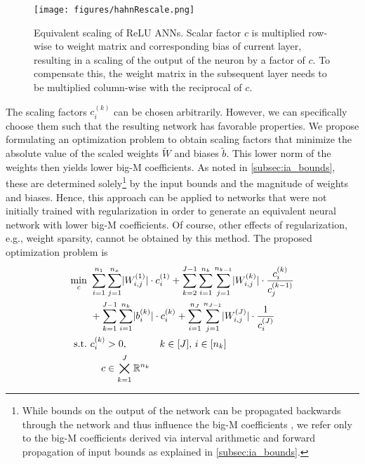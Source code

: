 \begin{figure}
    \centering
    \texttt{[image: figures/hahnRescale.png]}
    \caption{Equivalent scaling of ReLU ANNs. Scalar factor $c$ is multiplied row-wise to weight matrix and corresponding bias of current layer, resulting in a scaling of the output of the neuron by a factor of $c$. To compensate this, the weight matrix in the subsequent layer needs to be multiplied column-wise with the reciprocal of $c$.}
    \label{fig:rescale}
\end{figure}
%
The scaling factors $c_i^{(k)}$ can be chosen arbitrarily. However, we can specifically choose them such that the resulting network has favorable properties. We propose formulating an optimization problem to obtain scaling factors that minimize the absolute value of the scaled weights $\tilde{W}$ and biases $\tilde{b}$. This lower norm of the weights then yields lower big-M coefficients. As noted in \cref{subsec:ia_bounds}, these are determined solely\footnote{While bounds on the output of the network can be propagated backwards through the network and thus influence the big-M coefficients \citep{Grimstad2019}, we refer only to the big-M coefficients derived via interval arithmetic and forward propagation of input bounds as explained in \cref{subsec:ia_bounds}.} by the input bounds and the magnitude of weights and biases. Hence, this approach can be applied to networks that were not initially trained with regularization in order to generate an equivalent neural network with lower big-M coefficients. Of course, other effects of regularization, e.g., weight sparsity, cannot be obtained by this method. The proposed optimization problem is
%
\begin{equation}
    \begin{aligned}
        \min_{c}\ & \sum_{i=1}^{n_1} \sum_{j=1}^{n_x} \lvert W_{i,j}^{(1)} \rvert \cdot c_i^{(1)} +  \sum_{k=2}^{J-1} \sum_{i=1}^{n_k} \sum_{j=1}^{n_{k-1}}  \lvert W_{i,j}^{(k)} \rvert \cdot \frac{c_i^{(k)}}{c_j^{(k-1)}} \\*
        & + \sum_{k=1}^{J-1} \sum_{i=1}^{n_k} \lvert b_i^{(k)} \rvert \cdot c_i^{(k)} + \sum_{i=1}^{n_J} \sum_{j=1}^{n_{J-1}} \lvert W_{i,j}^{(J)} \rvert \cdot \frac{1}{c_i^{(J)}} \\
        \textrm{s.t.}\ & \begin{alignedat}[t]{3}
            c_i^{(k)} & > 0, \quad && k \in [J],\, i \in [n_k] \\
            c & \in \bigtimes_{k=1}^J \mathbb{R}^{n_k} \quad
        \end{alignedat}
    \end{aligned}
\end{equation}
